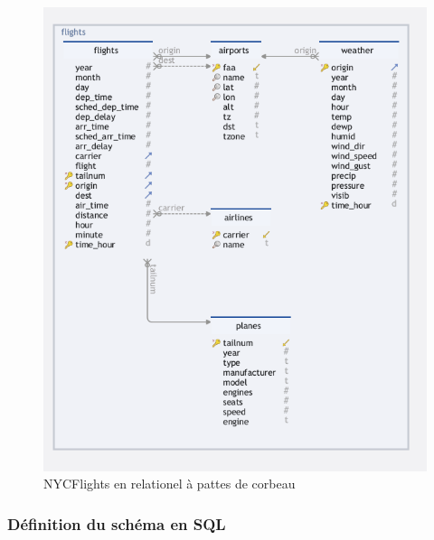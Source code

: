 \documentclass[
  10pt,
  titlepage=false]{exam}
\begin{document}
\begin{figure}[H]

{\centering \includegraphics[width=0.8\linewidth,height=\textheight,keepaspectratio]{../images/nycflights_layout_crop.png}

}

\caption{NYCFlights en relationel à pattes de corbeau}

\end{figure}%

\newpage{}

\subsubsection{Définition du schéma en
SQL}\label{duxe9finition-du-schuxe9ma-en-sql}
\end{document}
